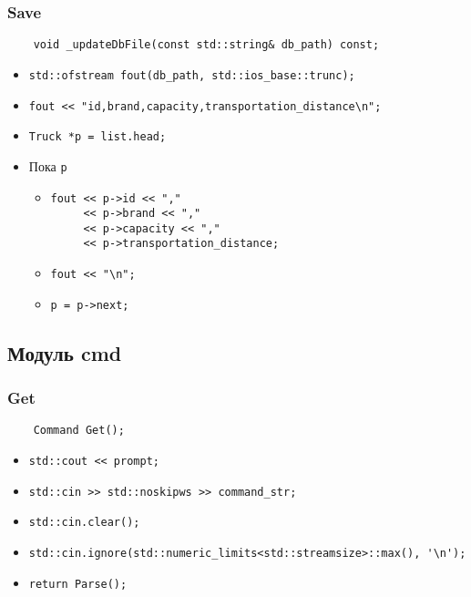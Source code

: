 \subsubsection*{Save}

\begin{lstlisting}
	void _updateDbFile(const std::string& db_path) const;
\end{lstlisting}

\begin{itemize}
	\item \verb|std::ofstream fout(db_path, std::ios_base::trunc);|
	\item \verb|fout << "id,brand,capacity,transportation_distance\n";|
	\item \verb|Truck *p = list.head;|
	\item Пока \verb|p|
	\begin{itemize}
		\item 
		\verb|fout << p->id << ","|\\
		\verb|     << p->brand << ","|\\
		\verb|     << p->capacity << ","|\\
		\verb|     << p->transportation_distance;|
		\item \verb|fout << "\n";|
		\item \verb|p = p->next;|
	\end{itemize}
\end{itemize}


\subsection*{Модуль cmd}


\subsubsection*{Get}

\begin{lstlisting}
	Command Get();
\end{lstlisting}

\begin{itemize}
	\item \verb|std::cout << prompt;|
	\item \verb|std::cin >> std::noskipws >> command_str;|
	\item \verb|std::cin.clear();|
	\item \verb|std::cin.ignore(std::numeric_limits<std::streamsize>::max(), '\n');|
	\item \verb|return Parse();|
\end{itemize}


